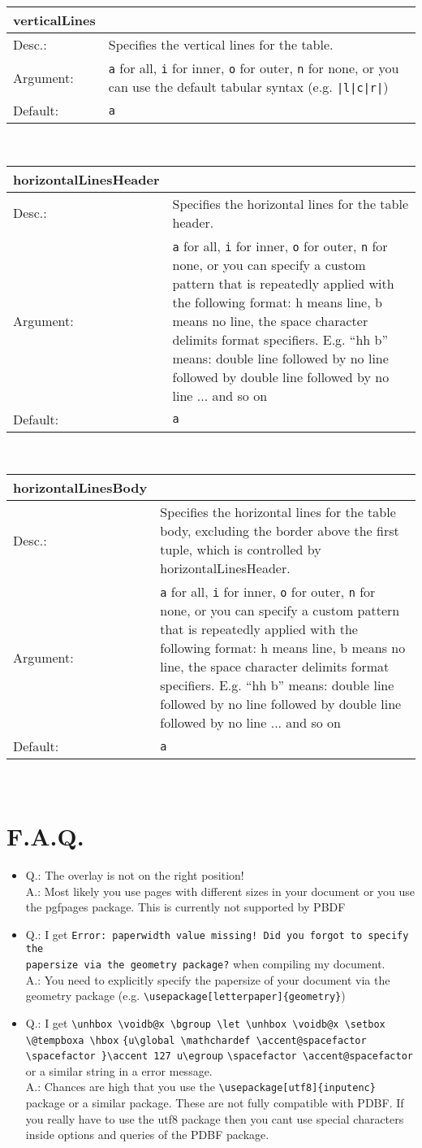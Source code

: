 \documentclass[11pt]{article}
\def\a{5cm}
\def\b{10.5cm}
\def\option#1#2#3#4{%
\noindent \begin{tabular}{|p{\a}|p{\b}|}
\hline
\textbf{#1} & \\
\hline
Desc.: & #2 \\
\hline
Argument: & #3\\
\hline
Default:& #4\\
\hline
\end{tabular} \\[4pt]%
}
\begin{document}
\option
{verticalLines}
{Specifies the vertical lines for the table.}
{\texttt{a} for all, \texttt{i} for inner, \texttt{o} for outer, \texttt{n} for none, or you can use the default tabular syntax (e.g. \texttt{|l|c|r|})}
{\texttt{a}}

\option
{horizontalLinesHeader}
{Specifies the horizontal lines for the table header.}
{\texttt{a} for all, \texttt{i} for inner, \texttt{o} for outer, \texttt{n} for none, or you can specify a custom pattern that is repeatedly applied with the following format: h means line, b means no line, the space character delimits format specifiers. E.g. ``hh b'' means: double line followed by no line followed by double line followed by no line ... and so on}
{\texttt{a}}

\option
{horizontalLinesBody}
{Specifies the horizontal lines for the table body, excluding the border above the first tuple, which is controlled by horizontalLinesHeader.}
{\texttt{a} for all, \texttt{i} for inner, \texttt{o} for outer, \texttt{n} for none, or you can specify a custom pattern that is repeatedly applied with the following format: h means line, b means no line, the space character delimits format specifiers. E.g. ``hh b'' means: double line followed by no line followed by double line followed by no line ... and so on}
{\texttt{a}}

\section{F.A.Q.}
\begin{itemize}
\item Q.: The overlay is not on the right position!\\
A.: Most likely you use pages with different sizes in your document or you use the pgfpages package. This is currently not supported by PBDF 
\item Q.: I get \verb|Error: paperwidth value missing! Did you forgot to specify the| \\ \verb|papersize via the geometry package?| when compiling my document.\\
A.: You need to explicitly specify the papersize of your document via the geometry package (e.g. \verb|\usepackage[letterpaper]{geometry}|)
\item Q.: I get \verb|\unhbox \voidb@x \bgroup \let \unhbox \voidb@x \setbox \@tempboxa \hbox| \verb|{u\global \mathchardef \accent@spacefactor \spacefactor }\accent 127 u\egroup| \newline \verb|\spacefactor \accent@spacefactor| or a similar string in a error message.\\
A.: Chances are high that you use the \verb|\usepackage[utf8]{inputenc}| package or a similar package. These are not fully compatible with PDBF. If you really have to use the utf8 package then you cant use special characters inside options and queries of the PDBF package.
\end{itemize}
\end{document}
